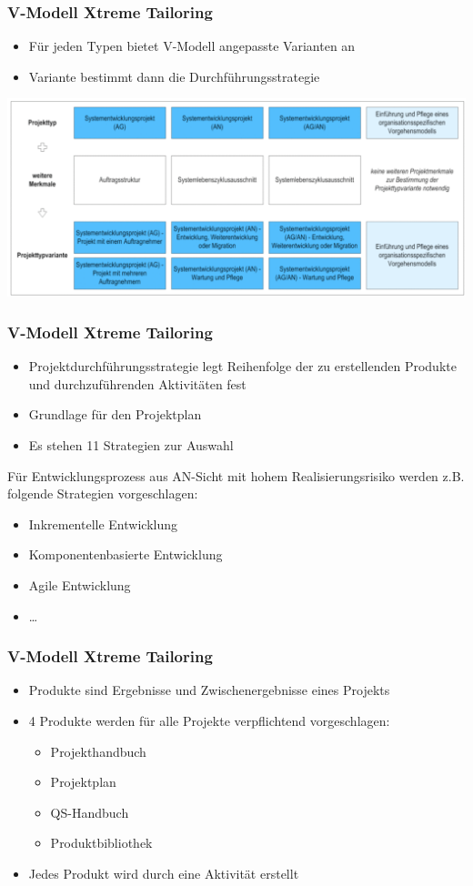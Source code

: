 \begin{frame}
\frametitle{V-Modell Xtreme Tailoring}
	\begin{itemize}
		\item Für jeden Typen bietet V-Modell angepasste Varianten an
		\item Variante bestimmt dann die Durchführungsstrategie
	\end{itemize}
	\center\includegraphics[width=1\textwidth,
			keepaspectratio=true]{bilder/vmodell_typen_varianten.png}
\end{frame}

\begin{frame}
\frametitle{V-Modell Xtreme Tailoring}
	\begin{itemize}
		\item Projektdurchführungsstrategie legt Reihenfolge der zu erstellenden
		Produkte und durchzuführenden Aktivitäten fest
		\item Grundlage für den Projektplan
		\item Es stehen 11 Strategien zur Auswahl
	\end{itemize}
	\bigskip
	Für Entwicklungsprozess aus AN-Sicht mit hohem Realisierungsrisiko werden
	z.B. folgende Strategien vorgeschlagen:
	\begin{itemize}
		\item Inkrementelle Entwicklung
		\item Komponentenbasierte Entwicklung
		\item Agile Entwicklung
		\item \ldots
	\end{itemize}
\end{frame}

\begin{frame}
\frametitle{V-Modell Xtreme Tailoring}
	\begin{itemize}
		\item Produkte sind Ergebnisse und Zwischenergebnisse eines Projekts
		\item 4 Produkte werden für alle Projekte verpflichtend vorgeschlagen:
		\begin{itemize}
			\item Projekthandbuch
			\item Projektplan
			\item QS-Handbuch
			\item Produktbibliothek
		\end{itemize}
		\item Jedes Produkt wird durch eine Aktivität erstellt
	\end{itemize}
\end{frame}

